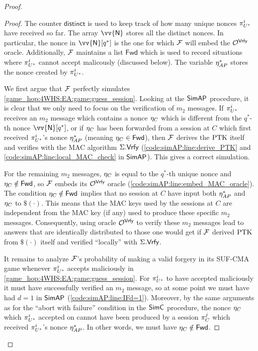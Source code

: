 \begin{proof}
\begin{proof}
The counter $\mathsf{distinct}$ is used to keep track of how many unique nonces $\eatarget$ have received so far.
The array $\vv{\mathsf{N}}$ stores all the distinct nonces. 
In particular,
the nonce in $\vv{\mathsf{N}}[q^*]$ is the one for which $\A[F]$ will embed the $\mathcal{O}^{\macvrfy}$  oracle.
Additionally,
$\A[F]$ maintains a list $\mathsf{Fwd}$ which is used to record situations where $\eatarget$ cannot accept malicously
(discussed below).
The variable $\nonce_{AP}^*$ stores the nonce created by $\eatarget$.

We first argue that $\A[F]$ perfectly simulates \cref{game_hop:4WHS:EA:game:guess_session}.
Looking at the $\simAP$ procedure,
it is clear that we only need to focus on the verification of $m_2$ messages.
If $\eatarget$ receives an $m_2$ message which contains a nonce $\nonce_{C}$ which is different from the $q^*$-th nonce $\vv{\mathsf{N}}[q^*]$,
or if $\nonce_{C}$ has been forwarded from a session at $C$ which first received $\eatarget$'s nonce $\nonce_{AP}^*$
(meaning $\nonce_{C} \in  \mathsf{Fwd}$),
then $\A[F]$ derives the $\PTK$ itself and verifies with the MAC algorithm $\mac.\macvrfy$ 
(\cref{code:simAP:line:derive_PTK} and \cref{code:simAP:line:local_MAC_check} in $\simAP$).
This gives a correct simulation.


For the remaining $m_2$ messages,
$\nonce_{C}$ is equal to the $q^*$-th unique nonce and $\nonce_{C} \notin \mathsf{Fwd}$,
so $\A[F]$ embeds its $\mathcal{O}^{\macvrfy}$ oracle
(\cref{code:simAP:line:embed_MAC_oracle}).
The condition $\nonce_{C} \notin \mathsf{Fwd}$ implies that no session at $C$ have input both $\nonce_{AP}^*$ and $\nonce_{C}$ to $\$(\cdot)$.
This means that the MAC keys used by the sessions at $C$ are independent from the MAC key
(if any) used to produce these specific $m_2$ messages.
Consequently,
using oracle $\mathcal{O}^{\macvrfy}$ to verify these $m_2$ messages lead to  answers that are identically distributed to those one would get if $\A[F]$ derived $\PTK$ from $\$(\cdot)$ itself and verified ``locally'' with $\mac.\macvrfy$.

It remains to analyze $\A[F]$'s probability of  making a valid forgery in its SUF-CMA game whenever $\eatarget$ accepts maliciously in \cref{game_hop:4WHS:EA:game:guess_session}.
For $\eatarget$ to have accepted maliciously it must have successfully verified an $m_2$ message,
so at some point we must have had $d = 1$ in $\simAP$
(\cref{code:simAP:line:IFd=1}).
Moreover,
by the same arguments as for the ``abort with failure'' condition in the $\simC$ procedure,
the nonce $\nonce_{C}$ which $\eatarget$ accepted on cannot have been produced by a session $\oracle[C][j]$ which received $\eatarget$'s nonce $\nonce_{AP}^*$.
In other words,
we must have $\nonce_{C} \notin \mathsf{Fwd}$.


\end{proof}
\end{proof}
